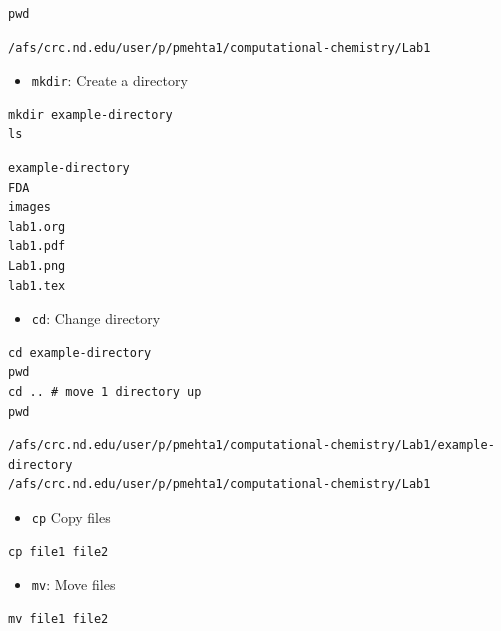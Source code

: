 \documentclass[11pt]{article}
\begin{document}
\begin{verbatim}
pwd
\end{verbatim}

\begin{verbatim}
/afs/crc.nd.edu/user/p/pmehta1/computational-chemistry/Lab1
\end{verbatim}

\begin{itemize}
\item \verb~mkdir~: Create a directory
\end{itemize}

\begin{verbatim}
mkdir example-directory
ls
\end{verbatim}

\begin{verbatim}
example-directory
FDA
images
lab1.org
lab1.pdf
Lab1.png
lab1.tex
\end{verbatim}

\begin{itemize}
\item \verb~cd~: Change directory
\end{itemize}

\begin{verbatim}
cd example-directory
pwd
cd .. # move 1 directory up
pwd
\end{verbatim}

\begin{verbatim}
/afs/crc.nd.edu/user/p/pmehta1/computational-chemistry/Lab1/example-directory
/afs/crc.nd.edu/user/p/pmehta1/computational-chemistry/Lab1
\end{verbatim}

\begin{itemize}
\item \verb~cp~ Copy files
\end{itemize}
\begin{verbatim}
cp file1 file2
\end{verbatim}


\begin{itemize}
\item \verb~mv~: Move files
\end{itemize}
\begin{verbatim}
mv file1 file2
\end{verbatim}
\end{document}
